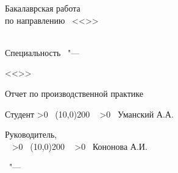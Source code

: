 \begin{center}
{%
Бакалаврская работа \\
по направлению \thesisSpecialtyNumber\ 
<<\thesisSpecialtyTitle>>
}
\\
\textbf {%
\thesisTitle}
\\
{\ProgModule}

\vspace{0pt plus2fill} %

\ifdefined\thesisSpecialtyTwoNumber
{%
Специальность \thesisSpecialtyTwoNumber\ "--- 

<<\thesisSpecialtyTwoTitle>>
}
\fi

\vspace{0pt plus2fill} %
Отчет по производственной практике

\thesisDegree
\end{center}
%
\vspace{0pt plus4fill} %
\begin{flushleft}

Студент 
\newcount\lineblank
{}
\loop
  \message{\ }
    \advance {}
    \ifnum \lineblank>0
    \repeat
\
\line(10,0){200} \
\newcount\mynameblank
{}
\loop
  \message{\ }
    \advance {}
    \ifnum \mynameblank>0
    \repeat
\
Уманский А.А. %

Руководитель,\\
\supervisorRegaliaShort
\
\newcount\lineblank
{}
\loop
  \message{\ }
    \advance {}
    \ifnum \lineblank>0
    \repeat
\
\line(10,0){200} \
\newcount\mynameblank
\mynameblank=50
\loop
  \message{\ }
    \advance {}
    \ifnum \mynameblank>0
    \repeat
\
Кононова А.И.

\end{flushleft}

%
\vspace{0pt plus4fill} %
{\centering\thesisCity\ "--- \thesisYear\par}
